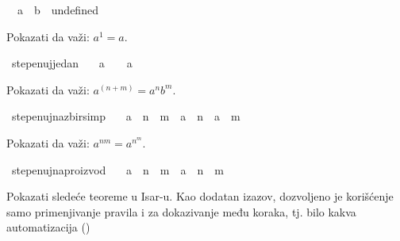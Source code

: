 \begin{isabellebody}
\begin{exercise}[subtitle=Zasnivanje prirodnih brojeva.]
\ \ {\isachardoublequoteopen}a\ {\isasymZcat}\ b\ {\isacharequal}{\kern0pt}\ undefined{\isachardoublequoteclose}%
\begin{isamarkuptext}%
Pokazati da važi: $a^1 = a$.%
\end{isamarkuptext}\isamarkuptrue%
\isamarkupfalse%
\ stepenuj{\isacharunderscore}{\kern0pt}jedan{\isacharcolon}{\kern0pt}\isanewline
\ \ \ {\isachardoublequoteopen}a\ {\isasymZcat}\ {\isasymone}\ {\isacharequal}{\kern0pt}\ a{\isachardoublequoteclose}\isanewline
\ \ %
\isadelimproof
%
\endisadelimproof
%
\isatagproof
%
\endisatagproof
{\isafoldproof}%
%
\isadelimproof
%
\endisadelimproof
%
\begin{isamarkuptext}%
Pokazati da važi: $a^{(n+m)} = a^n b^m$.%
\end{isamarkuptext}\isamarkuptrue%
\isamarkupfalse%
\ stepenuj{\isacharunderscore}{\kern0pt}na{\isacharunderscore}{\kern0pt}zbir{\isacharbrackleft}{\kern0pt}simp{\isacharbrackright}{\kern0pt}{\isacharcolon}{\kern0pt}\isanewline
\ \ \ {\isachardoublequoteopen}a\ {\isasymZcat}\ {\isacharparenleft}{\kern0pt}n\ {\isasymoplus}\ m{\isacharparenright}{\kern0pt}\ {\isacharequal}{\kern0pt}\ a\ {\isasymZcat}\ n\ {\isasymotimes}\ a\ {\isasymZcat}\ m{\isachardoublequoteclose}\isanewline
\ \ %
\isadelimproof
%
\endisadelimproof
%
\isatagproof
%
\endisatagproof
{\isafoldproof}%
%
\isadelimproof
%
\endisadelimproof
%
\begin{isamarkuptext}%
Pokazati da važi: $a^{nm} = a^{n^m}$.%
\end{isamarkuptext}\isamarkuptrue%
\isamarkupfalse%
\ stepenuj{\isacharunderscore}{\kern0pt}na{\isacharunderscore}{\kern0pt}proizvod{\isacharcolon}{\kern0pt}\isanewline
\ \ \ {\isachardoublequoteopen}a\ {\isasymZcat}\ {\isacharparenleft}{\kern0pt}n\ {\isasymotimes}\ m{\isacharparenright}{\kern0pt}\ {\isacharequal}{\kern0pt}\ a\ {\isasymZcat}\ n\ {\isasymZcat}\ m{\isachardoublequoteclose}\isanewline
\ \ %
\isadelimproof
%
\endisadelimproof
%
\isatagproof
%
\endisatagproof
{\isafoldproof}%
%
\isadelimproof
%
\endisadelimproof
%
\end{exercise}
%
\begin{exercise}[subtitle=Dodatni primeri.]
%
\begin{isamarkuptext}%
Pokazati sledeće teoreme u Isar-u. Kao dodatan izazov, dozvoljeno je korišćenje samo 
      primenjivanje pravila  i  za dokazivanje među koraka, tj. bilo
      kakva automatizacija () 

\end{isamarkuptext}
\end{exercise}
\end{isabellebody}
